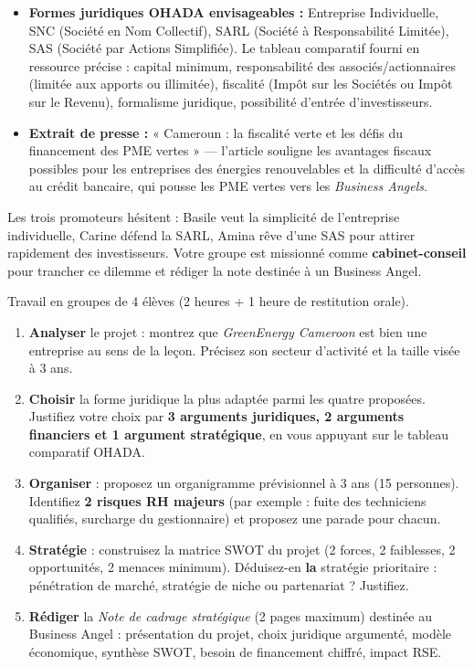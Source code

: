\documentclass[11pt]{article}
\newcounter{popsec}
\newcounter{popsub}
\newcommand{\courssub}[1]{%
  \stepcounter{popsub}%
  \par\vspace{9pt}\noindent{\popxbold\fontsize{11.5}{13}\selectfont\color{popink}{\color{poporange}\thepopsec.\thepopsub}\hspace{6pt}#1}\par\nopagebreak\vspace{4pt}
}
\begin{document}
\begin{itemize}
\item \textbf{Formes juridiques OHADA envisageables :} Entreprise Individuelle, SNC (Société en Nom Collectif), SARL (Société à Responsabilité Limitée), SAS (Société par Actions Simplifiée). Le tableau comparatif fourni en ressource précise : capital minimum, responsabilité des associés/actionnaires (limitée aux apports ou illimitée), fiscalité (Impôt sur les Sociétés ou Impôt sur le Revenu), formalisme juridique, possibilité d'entrée d'investisseurs.
\item \textbf{Extrait de presse :} « Cameroun : la fiscalité verte et les défis du financement des PME vertes » — l'article souligne les avantages fiscaux possibles pour les entreprises des énergies renouvelables et la difficulté d'accès au crédit bancaire, qui pousse les PME vertes vers les \emph{Business Angels}.
\end{itemize}

Les trois promoteurs hésitent : Basile veut la simplicité de l'entreprise individuelle, Carine défend la SARL, Amina rêve d'une SAS pour attirer rapidement des investisseurs. Votre groupe est missionné comme \textbf{cabinet-conseil} pour trancher ce dilemme et rédiger la note destinée à un Business Angel.

\courssub{Consignes}

Travail en groupes de 4 élèves (2 heures + 1 heure de restitution orale).

\begin{enumerate}
\item \textbf{Analyser} le projet : montrez que \emph{GreenEnergy Cameroon} est bien une entreprise au sens de la leçon. Précisez son secteur d'activité et la taille visée à 3 ans.
\item \textbf{Choisir} la forme juridique la plus adaptée parmi les quatre proposées. Justifiez votre choix par \textbf{3 arguments juridiques, 2 arguments financiers et 1 argument stratégique}, en vous appuyant sur le tableau comparatif OHADA.
\item \textbf{Organiser} : proposez un organigramme prévisionnel à 3 ans (15 personnes). Identifiez \textbf{2 risques RH majeurs} (par exemple : fuite des techniciens qualifiés, surcharge du gestionnaire) et proposez une parade pour chacun.
\item \textbf{Stratégie} : construisez la matrice SWOT du projet (2 forces, 2 faiblesses, 2 opportunités, 2 menaces minimum). Déduisez-en \textbf{la} stratégie prioritaire : pénétration de marché, stratégie de niche ou partenariat ? Justifiez.
\item \textbf{Rédiger} la \emph{Note de cadrage stratégique} (2 pages maximum) destinée au Business Angel : présentation du projet, choix juridique argumenté, modèle économique, synthèse SWOT, besoin de financement chiffré, impact RSE.
\end{enumerate}
\end{document}
